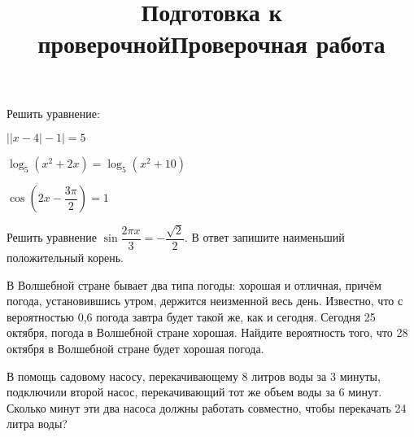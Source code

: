 %
\newpage
\title{Подготовка к проверочной}
\begin{listofex}
	\item Решить уравнение:
	\begin{enumcols}[itemcolumns=2]
		\item \( \big||x - 4|-1\big|= 5 \)
		\item \(\log_5(x^2+2x)=\log_5(x^2+10) \)
		\item {}
		\item \( \cos \left( 2x-\dfrac{3\pi}{2} \right) = 1 \) 
	\end{enumcols}
	\item Решить уравнение \( \sin\dfrac{2\pi x}{3}=-\dfrac{\sqrt{2}}{2} \). В ответ запишите наименьший положительный корень.
	\item В Волшебной стране бывает два типа погоды: хорошая и отличная, причём погода, установившись утром, держится неизменной весь день. Известно, что с вероятностью 0,6 погода завтра будет такой же, как и сегодня. Сегодня 25 октября, погода в Волшебной стране хорошая. Найдите вероятность того, что 28 октября в Волшебной стране будет хорошая погода.
	\item В помощь садовому насосу, перекачивающему 8 литров воды за 3 минуты, подключили
	второй насос, перекачивающий тот же объем воды за 6 минут. Сколько минут эти два
	насоса должны работать совместно, чтобы перекачать 24 литра воды?
	\item {}
\end{listofex}
\newpage
\title{Проверочная работа}
